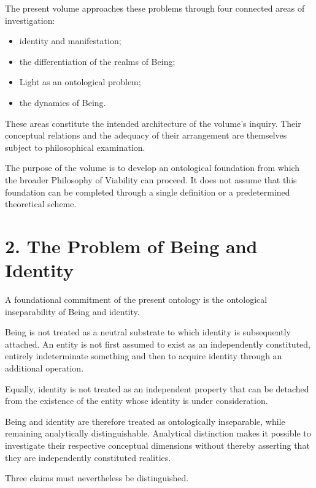 The present volume approaches these problems through
four connected areas of investigation:

\begin{itemize}
    \item identity and manifestation;
    \item the differentiation of the realms of Being;
    \item Light as an ontological problem;
    \item the dynamics of Being.
\end{itemize}

These areas constitute the intended architecture of
the volume's inquiry. Their conceptual relations and
the adequacy of their arrangement are themselves
subject to philosophical examination.

The purpose of the volume is to develop an ontological
foundation from which the broader Philosophy of Viability
can proceed. It does not assume that this foundation
can be completed through a single definition or a
predetermined theoretical scheme.


\section*{2. The Problem of Being and Identity}

A foundational commitment of the present ontology
is the ontological inseparability of Being and identity.

Being is not treated as a neutral substrate to which
identity is subsequently attached. An entity is not
first assumed to exist as an independently constituted,
entirely indeterminate something and then to acquire
identity through an additional operation.

Equally, identity is not treated as an independent
property that can be detached from the existence
of the entity whose identity is under consideration.

Being and identity are therefore treated as
ontologically inseparable, while remaining analytically
distinguishable. Analytical distinction makes it possible
to investigate their respective conceptual dimensions
without thereby asserting that they are independently
constituted realities.

Three claims must nevertheless be distinguished.

